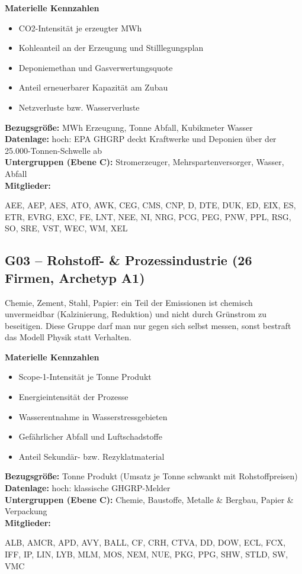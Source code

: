 \noindent\textbf{Materielle Kennzahlen}
\begin{itemize}[nosep,leftmargin=1.2em]
  \item CO2-Intensität je erzeugter MWh
  \item Kohleanteil an der Erzeugung und Stilllegungsplan
  \item Deponiemethan und Gasverwertungsquote
  \item Anteil erneuerbarer Kapazität am Zubau
  \item Netzverluste bzw. Wasserverluste
\end{itemize}
\noindent\textbf{Bezugsgröße:} MWh Erzeugung, Tonne Abfall, Kubikmeter Wasser\\
\textbf{Datenlage:} hoch: EPA GHGRP deckt Kraftwerke und Deponien über der 25.000-Tonnen-Schwelle ab\\
\textbf{Untergruppen (Ebene C):} Stromerzeuger, Mehrspartenversorger, Wasser, Abfall\\
\textbf{Mitglieder:} {\raggedright\small\ttfamily AEE, AEP, AES, ATO, AWK, CEG, CMS, CNP, D, DTE, DUK, ED, EIX, ES, ETR, EVRG, EXC, FE, LNT, NEE, NI, NRG, PCG, PEG, PNW, PPL, RSG, SO, SRE, VST, WEC, WM, XEL\par}

\medskip
\subsection*{G03 -- Rohstoff- \& Prozessindustrie \normalfont\small (26 Firmen, Archetyp A1)}
\noindent Chemie, Zement, Stahl, Papier: ein Teil der Emissionen ist chemisch unvermeidbar (Kalzinierung, Reduktion) und nicht durch Grünstrom zu beseitigen. Diese Gruppe darf man nur gegen sich selbst messen, sonst bestraft das Modell Physik statt Verhalten.

\noindent\textbf{Materielle Kennzahlen}
\begin{itemize}[nosep,leftmargin=1.2em]
  \item Scope-1-Intensität je Tonne Produkt
  \item Energieintensität der Prozesse
  \item Wasserentnahme in Wasserstressgebieten
  \item Gefährlicher Abfall und Luftschadstoffe
  \item Anteil Sekundär- bzw. Rezyklatmaterial
\end{itemize}
\noindent\textbf{Bezugsgröße:} Tonne Produkt (Umsatz je Tonne schwankt mit Rohstoffpreisen)\\
\textbf{Datenlage:} hoch: klassische GHGRP-Melder\\
\textbf{Untergruppen (Ebene C):} Chemie, Baustoffe, Metalle \& Bergbau, Papier \& Verpackung\\
\textbf{Mitglieder:} {\raggedright\small\ttfamily ALB, AMCR, APD, AVY, BALL, CF, CRH, CTVA, DD, DOW, ECL, FCX, IFF, IP, LIN, LYB, MLM, MOS, NEM, NUE, PKG, PPG, SHW, STLD, SW, VMC\par}

